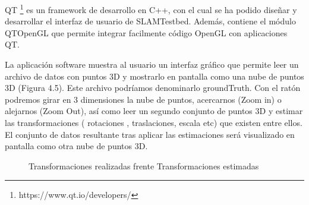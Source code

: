 QT \footnote{https://www.qt.io/developers/} es un framework de desarrollo en C++, con el cual se ha podido diseñar y desarrollar el interfaz de usuario de SLAMTestbed. Además, contiene el módulo QTOpenGL que permite integrar facilmente código OpenGL con aplicaciones QT.

La aplicación software muestra al usuario un interfaz gráfico que permite leer un archivo de datos con puntos 3D y mostrarlo en pantalla como una nube de puntos 3D (Figura 4.5). Este archivo podríamos denominarlo groundTruth.
Con el ratón podremos girar en 3 dimensiones la nube de puntos, acercarnos  (Zoom in) o alejarnos (Zoom Out), así como leer un segundo conjunto de puntos 3D y estimar las transformaciones ( rotaciones , traslaciones, escala etc) que existen entre ellos. El conjunto de datos resultante tras aplicar las estimaciones será visualizado en pantalla como otra nube de puntos 3D.

\begin{figure}[H]
\begin{center}
\hspace{0.5cm}
\end{center}
\caption{Transformaciones realizadas frente Transformaciones estimadas }
\end{figure}



